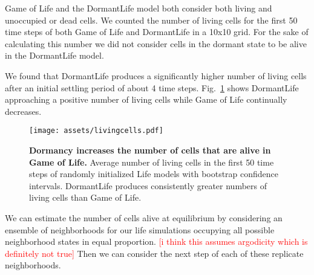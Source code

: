 \documentclass[12pt]{article}
\newcommand{\figref}[1]{Fig.~\ref{fig:#1}}
\newcommand{\note}[1]{\textcolor{red}{[#1]}}
\begin{document}
Game of Life and the DormantLife model both consider both living and unoccupied
or dead cells. We counted the number of living cells for the first 50 time
steps of both Game of Life and DormantLife in a 10x10 grid. For the sake of
calculating this number we did not consider cells in the dormant state to be
alive in the DormantLife model.

We found that DormantLife produces a significantly higher number of living cells
after an initial settling period of about 4 time steps. \figref{living-cells}
shows DormantLife approaching a positive number of living cells while Game of
Life continually decreases.

\begin{figure}
    \centering
    \texttt{[image: assets/livingcells.pdf]}
    \caption{\textbf{Dormancy increases the number of cells that are alive in
    Game of Life.} Average number of living cells in the first 50 time steps of
    randomly initialized Life models with bootstrap confidence intervals.
    DormantLife produces consistently greater numbers of living cells than
    Game of Life.}
    \label{fig:living-cells}
\end{figure}

We can estimate the number of cells alive at equilibrium by considering an
ensemble of neighborhoods for our life simulations occupying all possible
neighborhood states in equal proportion. \note{i think this assumes argodicity
which is definitely not true} Then we can consider the next step of each of
these replicate neighborhoods. 

\printbibliography
\end{document}
